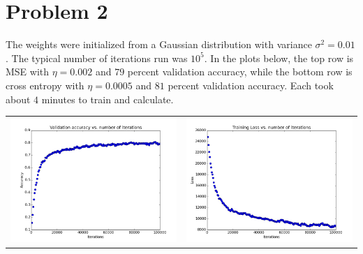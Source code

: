 \documentclass[11pt]{article}
\newcommand{\asdf}{\newline\newline}
\begin{document}
\section*{Problem 2}
The weights were initialized from a Gaussian distribution with variance $\sigma^2=0.01$. The typical number of iterations run was $10^5$. In the plots below, the top row is MSE with $\eta=0.002$ and $79$ percent validation accuracy, while the bottom row is cross entropy with $\eta=0.0005$ and $81$ percent validation accuracy. Each took about $4$ minutes to train and calculate.\asdf
\begin{tabular}{cc}
\includegraphics[scale=0.4]{images/accuracy_mse} & \includegraphics[scale=0.4]{images/loss_mse} \\

\end{tabular}
\end{document}
